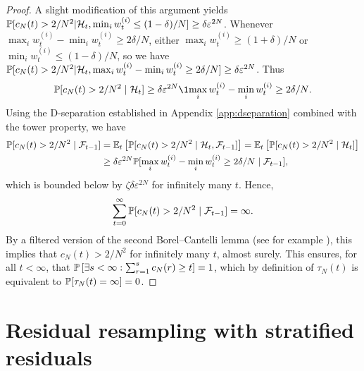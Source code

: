 \begin{proof}
A slight modification of this argument yields $\mathbb{P}[ c_N(t) > 2/N^2 | \mathcal{H}_t, \min_i w_t^{(i)} \leq (1-\delta)/N ] \geq \delta \varepsilon^{2N} $.
Whenever $\max_i w_t^{(i)} - \min_i w_t^{(i)} \geq 2\delta/N$, either $\max_i w_t^{(i)} \geq (1+\delta)/N$ or $\min_i w_t^{(i)} \leq (1-\delta)/N$, so we have 
$\mathbb{P}[ c_N(t) > 2/N^2 | \mathcal{H}_t, \max_i w_t^{(i)} - \min_i w_t^{(i)} \geq 2\delta/N ] \geq \delta \varepsilon^{2N}$.
Thus 
\begin{equation*}
\Prob[ c_N(t)>2/N^2 \mid \mathcal{H}_t ] \geq \delta \varepsilon^{2N}\1{\max_i w_t^{(i)} - \min_i w_t^{(i)} \geq 2\delta/N} .
\end{equation*}
Using the D-separation established in Appendix \ref{app:dseparation} combined with the tower property, we have
\begin{align*}
\mathbb{P}[ c_N(t)>2/N^2 \mid \mathcal{F}_{t-1} ]
&=\mathbb{E}_t\left[ \mathbb{P}[ c_N(t)>2/N^2 \mid \mathcal{H}_t, \mathcal{F}_{t-1} ] \right]
=\mathbb{E}_t\left[ \mathbb{P}[ c_N(t)>2/N^2 \mid \mathcal{H}_t ] \right] \\
&\geq \delta \varepsilon^{2N} \mathbb{P}[ \max_i w_t^{(i)} - \min_i w_t^{(i)} \geq 2\delta/N \mid \mathcal{F}_{t-1} ] ,
\end{align*}
which is bounded below by $ \zeta \delta \varepsilon^{2N} $ for infinitely many $t$. 
Hence,
\begin{equation*}
\sum_{t=0}^\infty \mathbb{P}[ c_N(t) > 2/N^2 \mid \mathcal{F}_{t-1} ] = \infty .
\end{equation*}
By a filtered version of the second Borel--Cantelli lemma (see for example \cite[Theorem 4.3.4]{durrett2019}), this implies that $c_N(t) >2/N^2$ for infinitely many $t$, almost surely.
This ensures, for all $t <\infty$, that $\mathbb{P}\left[ \exists s<\infty : \sum_{r=1}^s c_N(r) \geq t \right] =1$, which by definition of $\tau_N(t)$ is equivalent to $\mathbb{P}[ \tau_N(t) = \infty ] =0$.
\end{proof}





\section{Residual resampling with stratified residuals}


